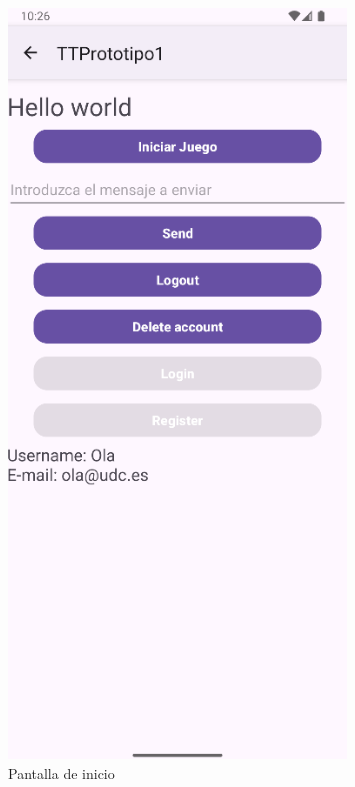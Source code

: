 \documentclass[a4paper,openright,12pt]{article}
\begin{document}
\begin{figure}[htp]
    \centering
    \begin{minipage}{0.4\textwidth}
        \centering
        \includegraphics[width=0.8\textwidth]{Images/Vista_It2.png} 
        \caption{Pantalla de inicio}
        \label{fig:Pantalla de inicio}
    \end{minipage}
    \hfill
    \begin{minipage}{0.4\textwidth}
        \centering

\end{minipage}
\end{figure}
\end{document}
